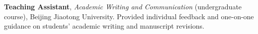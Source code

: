 \textbf{Teaching Assistant}, \emph{Academic Writing and Communication} (undergraduate course), Beijing Jiaotong University. Provided individual feedback and one-on-one guidance on students' academic writing and manuscript revisions.
